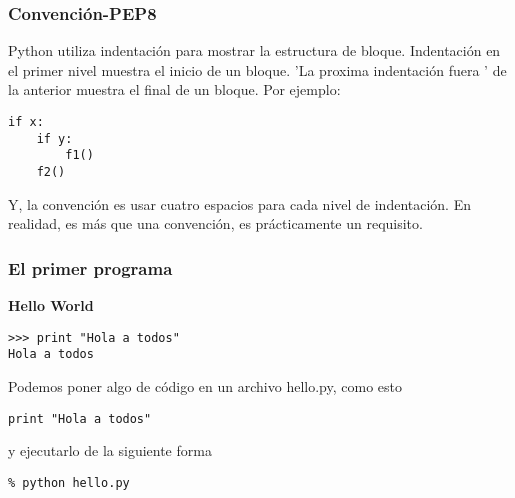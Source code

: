 \documentclass[10pt]{beamer}
\begin{document}
\begin{frame}[fragile]
\frametitle{Convenci\'on-PEP8}
Python utiliza indentaci\'on para mostrar la estructura de bloque. Indentaci\'on en el primer nivel muestra el inicio de un bloque. 'La proxima  indentaci\'on fuera ' de la anterior  muestra  el final de un bloque. Por ejemplo: 

\vspace{0.2cm}


\begin{lstlisting}
if x:
    if y:
        f1()
    f2()
\end{lstlisting}

Y, la convenci\'on es usar cuatro espacios para cada nivel de indentaci\'on. En realidad, es m\'as que una convenci\'on, es pr\'acticamente un requisito.
\end{frame}

\begin{frame}[fragile]
\frametitle{El primer programa}
\textbf{Hello World}

\vspace{0.2cm}

\begin{lstlisting}
>>> print "Hola a todos"
Hola a todos
\end{lstlisting}

\vspace{0.2cm}

Podemos poner algo de c\'odigo en un archivo hello.py, como esto
  
\begin{lstlisting}
print "Hola a todos"
\end{lstlisting}
\vspace{0.2cm}

y ejecutarlo de la siguiente forma

\vspace{0.2cm}

\begin{lstlisting}
% python hello.py 
\end{lstlisting}



\end{frame}
\end{document}
